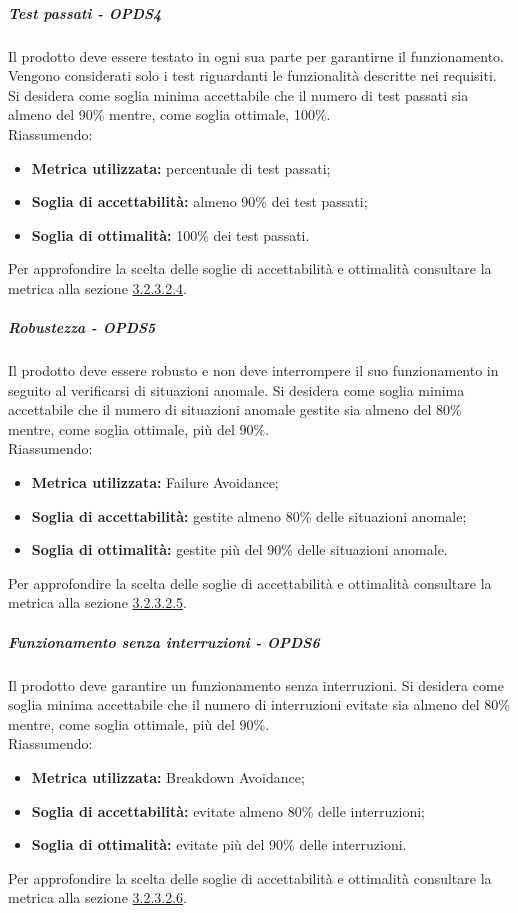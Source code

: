 \documentclass[PianoDiQualifica.tex]{subfiles}
\begin{document}
				\subparagraph{Test passati - OPDS4}
				Il prodotto deve essere testato in ogni sua parte per garantirne il funzionamento. Vengono considerati solo i test riguardanti le funzionalità descritte nei requisiti.
				Si desidera come soglia minima accettabile che il numero di test passati sia almeno del 90\% mentre, come soglia ottimale, 100\%. \\
				Riassumendo:
				\begin{itemize}
				\item \textbf{Metrica utilizzata:} percentuale di test passati;
				\item \textbf{Soglia di accettabilità:} almeno 90\% dei test passati;
				\item \textbf{Soglia di ottimalità:} 100\% dei test passati.
				\end{itemize}
				Per approfondire la scelta delle soglie di accettabilità e ottimalità consultare la metrica alla sezione \hyperlink{test_passati}{3.2.3.2.4}.

				\subparagraph{Robustezza - OPDS5}
				Il prodotto deve essere robusto e non deve interrompere il suo funzionamento in seguito al verificarsi di situazioni anomale.
				Si desidera come soglia minima accettabile che il numero di situazioni anomale gestite sia almeno del 80\% mentre, come soglia ottimale, più del 90\%. \\
				Riassumendo:
				\begin{itemize}
				\item \textbf{Metrica utilizzata:} Failure Avoidance;
				\item \textbf{Soglia di accettabilità:} gestite almeno 80\% delle situazioni anomale;
				\item \textbf{Soglia di ottimalità:} gestite più del 90\% delle situazioni anomale.
				\end{itemize}
				Per approfondire la scelta delle soglie di accettabilità e ottimalità consultare la metrica alla sezione \hyperlink{failure}{3.2.3.2.5}.

				\subparagraph{Funzionamento senza interruzioni - OPDS6}
				Il prodotto deve garantire un funzionamento senza interruzioni.
				Si desidera come soglia minima accettabile che il numero di interruzioni evitate sia almeno del 80\% mentre, come soglia ottimale, più del 90\%. \\
				Riassumendo:
				\begin{itemize}
				\item \textbf{Metrica utilizzata:} Breakdown Avoidance;
				\item \textbf{Soglia di accettabilità:} evitate almeno 80\% delle interruzioni;
				\item \textbf{Soglia di ottimalità:} evitate più del 90\% delle interruzioni.
				\end{itemize}
				Per approfondire la scelta delle soglie di accettabilità e ottimalità consultare la metrica alla sezione \hyperlink{breakdown}{3.2.3.2.6}.
\end{document}
